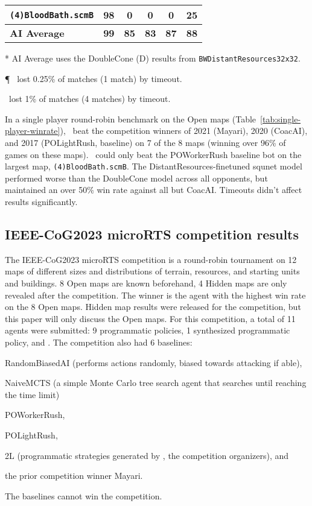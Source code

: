 \documentclass{article}
\begin{document}
\begin{table}[ht]
\begin{threeparttable}
\begin{tabular}{lcccc|c}
    \texttt{(4)BloodBath.scmB} & \textbf{98} & 0 & 0 & 0 & 25\tnote{\dag} \\
    \hline
    \textbf{AI Average}\tnote{*} & \textbf{99} & \textbf{85} & \textbf{83} & \textbf{87} & \textbf{88} \\
    \end{tabular}
    \begin{tablenotes}
    \item[*] AI Average uses the DoubleCone (D) results from \texttt{BWDistantResources32x32}.
    \item[\P] \agentName\ lost 0.25\% of matches (1 match) by timeout.
    \item[\dag] \agentName\ lost  1\% of matches (4 matches) by timeout.
    \end{tablenotes}
    \end{threeparttable}
\end{table}

In a single player round-robin benchmark on the Open maps (Table~\ref{tab:single-player-winrate}), \agentName\
beat the competition winners of 2021 (Mayari), 2020 (CoacAI), and 2017 (POLightRush,
baseline) on 7 of the 8 maps (winning over 96\% of games on these maps). \agentName\
could only beat the POWorkerRush baseline bot on the largest map,
\texttt{(4)BloodBath.scmB}. The DistantResources-finetuned squnet model performed worse than the DoubleCone model
across all opponents, but maintained an over 50\% win rate against all but CoacAI. Timeouts didn't affect results significantly.

\subsection{IEEE-CoG2023 microRTS competition results}
The IEEE-CoG2023 microRTS competition is a round-robin tournament on 12 maps of
different sizes and distributions of terrain, resources, and starting units and
buildings. 8 Open maps are known beforehand, 4 Hidden maps are only revealed after the
competition. The winner is the agent with the highest win rate on the 8 Open maps.
Hidden map results were released for the competition, but this paper will only discuss
the Open maps. For
this competition, a total of 11 agents were submitted: 9 programmatic policies, 1
synthesized programmatic policy, and \agentName. The competition also had 6
baselines:
\begin{inparaenum}[(1)]
    \item RandomBiasedAI (performs actions randomly, biased towards attacking if able),
    \item NaiveMCTS (a simple Monte Carlo tree search agent that searches until reaching
    the time limit)
    \item POWorkerRush,
    \item POLightRush,
    \item 2L (programmatic strategies generated by \citet{Moraes2023ChoosingWY}, the
    competition organizers), and
    \item the prior competition winner Mayari.
\end{inparaenum}
The baselines cannot win the competition.
\end{document}
